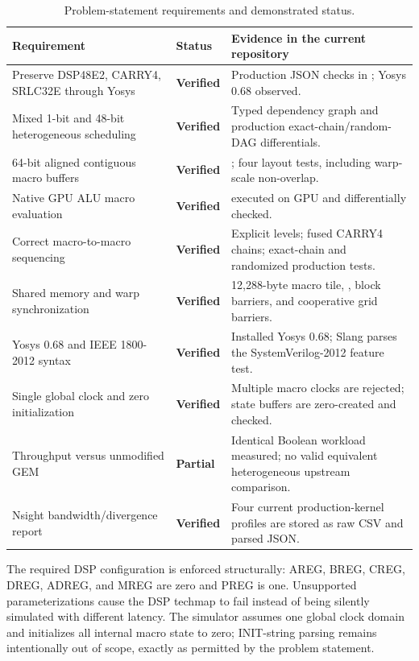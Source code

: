 \documentclass[11pt,a4paper]{article}
\newcommand{\code}[1]{\texttt{\detokenize{#1}}}
\newcommand{\verified}{\textbf{Verified}}
\newcommand{\partialstatus}{\textbf{Partial}}
\begin{document}
\begin{table}[H]
\centering
\caption{Problem-statement requirements and demonstrated status.}
\begin{tabularx}{\textwidth}{P{44mm} C{25mm} Y}
\toprule
Requirement & Status & Evidence in the current repository \\
\midrule
Preserve DSP48E2, CARRY4, SRLC32E through Yosys & \verified & Production JSON checks in ; Yosys 0.68 observed. \\
Mixed 1-bit and 48-bit heterogeneous scheduling & \verified & Typed dependency graph and production exact-chain/random-DAG differentials. \\
64-bit aligned contiguous macro buffers & \verified & ; four layout tests, including warp-scale non-overlap. \\
Native GPU ALU macro evaluation & \verified &  executed on GPU and differentially checked. \\
Correct macro-to-macro sequencing & \verified & Explicit levels; fused CARRY4 chains; exact-chain and randomized production tests. \\
Shared memory and warp synchronization & \verified & 12,288-byte macro tile, \code{__ballot_sync}, block barriers, and cooperative grid barriers. \\
Yosys 0.68 and IEEE 1800-2012 syntax & \verified & Installed Yosys 0.68; Slang parses the SystemVerilog-2012 feature test. \\
Single global clock and zero initialization & \verified & Multiple macro clocks are rejected; state buffers are zero-created and checked. \\
Throughput versus unmodified GEM & \partialstatus & Identical Boolean workload measured; no valid equivalent heterogeneous upstream comparison. \\
Nsight bandwidth/divergence report & \verified & Four current production-kernel profiles are stored as raw CSV and parsed JSON. \\
\bottomrule
\end{tabularx}
\end{table}

The required DSP configuration is enforced structurally: AREG, BREG, CREG,
DREG, ADREG, and MREG are zero and PREG is one.  Unsupported parameterizations
cause the DSP techmap to fail instead of being silently simulated with different
latency.  The simulator assumes one global clock domain and initializes all
internal macro state to zero; INIT-string parsing remains intentionally out of
scope, exactly as permitted by the problem statement.
\end{document}

